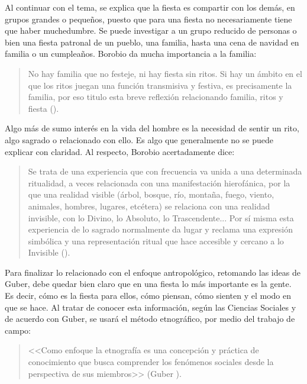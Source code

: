 \documentclass[14pt,letterpaper,twoside]{extbook} %
\begin{document}
\noindent Al continuar con el tema, se explica que la fiesta es compartir con los demás, en grupos grandes o pequeños, puesto que para una fiesta no necesariamente tiene que haber muchedumbre. Se puede investigar a un grupo reducido de personas o bien una fiesta patronal de un
pueblo, una familia, hasta una cena de navidad en familia o un cumpleaños. Borobio da mucha importancia a la familia:

\begin{quotation}
\noindent No hay familia que no festeje, ni hay fiesta sin ritos. Si hay un ámbito en el que los ritos juegan una función transmisiva y festiva, es precisamente la familia, por eso titulo esta breve reflexión relacionando familia, ritos y fiesta ().
\end{quotation}

\noindent Algo más de sumo interés en la vida del hombre es la necesidad de sentir un rito, algo sagrado o relacionado con ello. Es algo que generalmente no se puede explicar con claridad. Al respecto, Borobio acertadamente dice:

\begin{quotation}
\noindent Se trata de una experiencia que con frecuencia va unida a una determinada ritualidad, a veces relacionada con una manifestación hierofánica, por la que una realidad visible (árbol, bosque, río, montaña, fuego, viento, animales, hombres, lugares, etcétera) se relaciona con una realidad invisible, con lo Divino, lo Absoluto, lo Trascendente... Por sí misma esta experiencia de lo sagrado normalmente da lugar y reclama una expresión simbólica y una representación ritual que hace accesible y cercano a lo Invisible ().
\end{quotation}

\noindent Para finalizar lo relacionado con el enfoque antropológico, retomando las ideas de Guber, debe quedar bien claro que en una fiesta lo más importante es la gente. Es decir, cómo es la fiesta para ellos, cómo piensan, cómo sienten y el modo en que se hace. Al tratar de conocer esta información, según las Ciencias Sociales y de acuerdo con Guber, se usará el método etnográfico, por medio del trabajo de campo: 

\begin{quotation}
\noindent <<Como enfoque la etnografía es una concepción y práctica de conocimiento que busca comprender los fenómenos sociales desde la perspectiva de sus miembros>> (Guber ).
\end{quotation}
\end{document}
